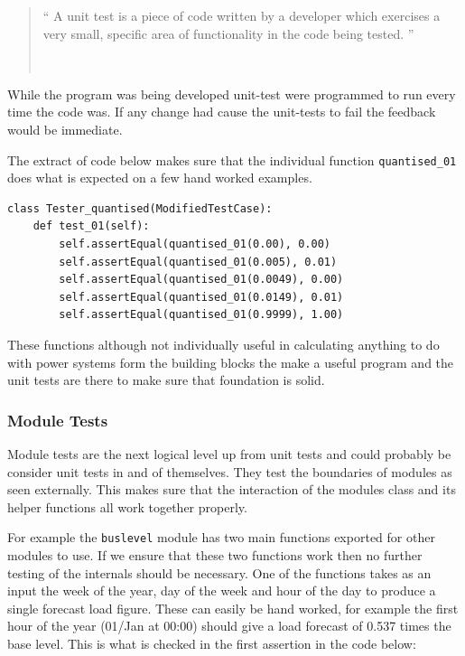 \documentclass[a4paper,oneside,12pt]{report}
\newcommand{\tmpquotecite}{}%
\newenvironment{myquote}[1][]
{\renewcommand{\tmpquotecite}{#1}\begin{quote}\begin{itshape}``}
{''\end{itshape}~{\normalfont~\tmpquotecite}\end{quote}}
\begin{document}
\begin{myquote}[\cite{Hunt2007}]
A unit test is a piece of code written by a developer which exercises a very small, specific area of functionality in the code being tested.
\end{myquote}

While the program was being developed unit-test were programmed to run every time the code was. If any change had cause the unit-tests to fail the feedback would be immediate.

The extract of code below makes sure that the individual function \texttt{quantised\_01} does what is expected on a few hand worked examples.

\begin{verbatim}
class Tester_quantised(ModifiedTestCase):
    def test_01(self):
        self.assertEqual(quantised_01(0.00), 0.00)
        self.assertEqual(quantised_01(0.005), 0.01)
        self.assertEqual(quantised_01(0.0049), 0.00)
        self.assertEqual(quantised_01(0.0149), 0.01)
        self.assertEqual(quantised_01(0.9999), 1.00)
\end{verbatim}

These functions although not individually useful in calculating anything
to do with power systems form the building blocks the make a useful
program and the unit tests are there to make sure that foundation is
solid.

\subsubsection{Module Tests}

Module tests are the next logical level up from unit tests and could
probably be consider unit tests in and of themselves. They test the
boundaries of modules as seen externally. This makes sure that the
interaction of the modules class and its helper functions all work
together properly.

For example the \texttt{buslevel} module has two main functions exported
for other modules to use. If we ensure that these two functions work
then no further testing of the internals should be necessary. One of
the functions takes as an input the week of the year, day of the week
and hour of the day to produce a single forecast load figure. These can
easily be hand worked, for example the first hour of the year (01/Jan
at 00:00) should give a load forecast of 0.537 times the base level.
This is what is checked in the first assertion in the code below:
\end{document}
